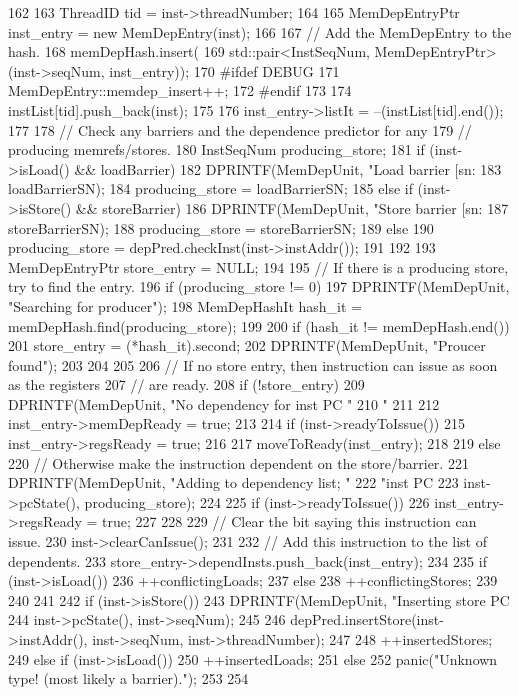 \begin{DoxyCode}
162 {
163     ThreadID tid = inst->threadNumber;
164 
165     MemDepEntryPtr inst_entry = new MemDepEntry(inst);
166 
167     // Add the MemDepEntry to the hash.
168     memDepHash.insert(
169         std::pair<InstSeqNum, MemDepEntryPtr>(inst->seqNum, inst_entry));
170 #ifdef DEBUG
171     MemDepEntry::memdep_insert++;
172 #endif
173 
174     instList[tid].push_back(inst);
175 
176     inst_entry->listIt = --(instList[tid].end());
177 
178     // Check any barriers and the dependence predictor for any
179     // producing memrefs/stores.
180     InstSeqNum producing_store;
181     if (inst->isLoad() && loadBarrier) {
182         DPRINTF(MemDepUnit, "Load barrier [sn:%
183                 loadBarrierSN);
184         producing_store = loadBarrierSN;
185     } else if (inst->isStore() && storeBarrier) {
186         DPRINTF(MemDepUnit, "Store barrier [sn:%
187                 storeBarrierSN);
188         producing_store = storeBarrierSN;
189     } else {
190         producing_store = depPred.checkInst(inst->instAddr());
191     }
192 
193     MemDepEntryPtr store_entry = NULL;
194 
195     // If there is a producing store, try to find the entry.
196     if (producing_store != 0) {
197         DPRINTF(MemDepUnit, "Searching for producer\n");
198         MemDepHashIt hash_it = memDepHash.find(producing_store);
199 
200         if (hash_it != memDepHash.end()) {
201             store_entry = (*hash_it).second;
202             DPRINTF(MemDepUnit, "Proucer found\n");
203         }
204     }
205 
206     // If no store entry, then instruction can issue as soon as the registers
207     // are ready.
208     if (!store_entry) {
209         DPRINTF(MemDepUnit, "No dependency for inst PC "
210                 "%
211 
212         inst_entry->memDepReady = true;
213 
214         if (inst->readyToIssue()) {
215             inst_entry->regsReady = true;
216 
217             moveToReady(inst_entry);
218         }
219     } else {
220         // Otherwise make the instruction dependent on the store/barrier.
221         DPRINTF(MemDepUnit, "Adding to dependency list; "
222                 "inst PC %
223                 inst->pcState(), producing_store);
224 
225         if (inst->readyToIssue()) {
226             inst_entry->regsReady = true;
227         }
228 
229         // Clear the bit saying this instruction can issue.
230         inst->clearCanIssue();
231 
232         // Add this instruction to the list of dependents.
233         store_entry->dependInsts.push_back(inst_entry);
234 
235         if (inst->isLoad()) {
236             ++conflictingLoads;
237         } else {
238             ++conflictingStores;
239         }
240     }
241 
242     if (inst->isStore()) {
243         DPRINTF(MemDepUnit, "Inserting store PC %
244                 inst->pcState(), inst->seqNum);
245 
246         depPred.insertStore(inst->instAddr(), inst->seqNum, inst->threadNumber);
247 
248         ++insertedStores;
249     } else if (inst->isLoad()) {
250         ++insertedLoads;
251     } else {
252         panic("Unknown type! (most likely a barrier).");
253     }
254 }
\end{DoxyCode}

